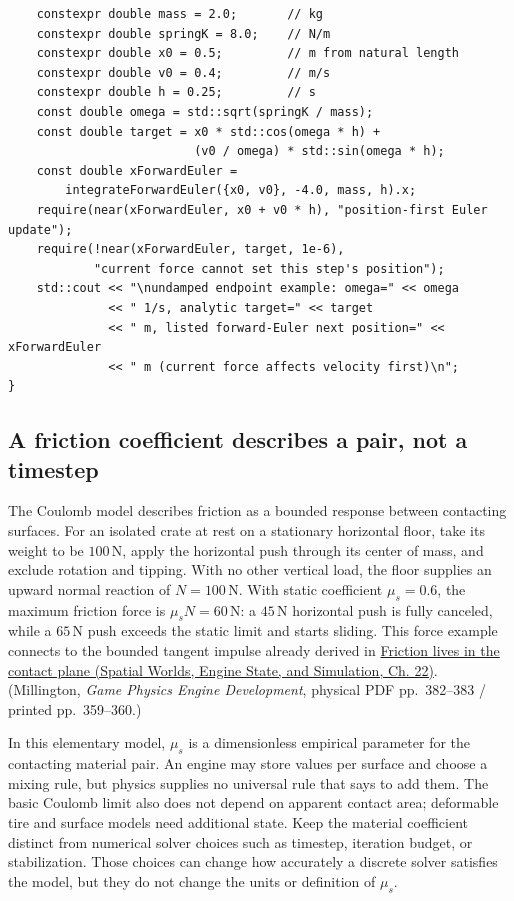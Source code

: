 \begin{verbatim}
    constexpr double mass = 2.0;       // kg
    constexpr double springK = 8.0;    // N/m
    constexpr double x0 = 0.5;         // m from natural length
    constexpr double v0 = 0.4;         // m/s
    constexpr double h = 0.25;         // s
    const double omega = std::sqrt(springK / mass);
    const double target = x0 * std::cos(omega * h) +
                          (v0 / omega) * std::sin(omega * h);
    const double xForwardEuler =
        integrateForwardEuler({x0, v0}, -4.0, mass, h).x;
    require(near(xForwardEuler, x0 + v0 * h), "position-first Euler update");
    require(!near(xForwardEuler, target, 1e-6),
            "current force cannot set this step's position");
    std::cout << "\nundamped endpoint example: omega=" << omega
              << " 1/s, analytic target=" << target
              << " m, listed forward-Euler next position=" << xForwardEuler
              << " m (current force affects velocity first)\n";
}
\end{verbatim}

\subsection{A friction coefficient describes a pair, not a timestep}\label{06-engine-ii-ch047-a-friction-coefficient-describes-a-pair-not-a-timestep}

The Coulomb model describes friction as a bounded response between contacting surfaces. For an isolated crate at rest on a stationary horizontal floor, take its weight to be \(100\,\mathrm N\), apply the horizontal push through its center of mass, and exclude rotation and tipping. With no other vertical load, the floor supplies an upward normal reaction of \(N=100\,\mathrm N\). With static coefficient \(\mu_s=0.6\), the maximum friction force is \(\mu_sN=60\,\mathrm N\): a \(45\,\mathrm N\) horizontal push is fully canceled, while a \(65\,\mathrm N\) push exceeds the static limit and starts sliding. This force example connects to the bounded tangent impulse already derived in \href{../05-Spatial-Worlds-Engine-State-and-Simulation/main.pdf\#nameddest=06-engine-ii-ch033-friction-lives-in-the-contact-plane}{Friction lives in the contact plane (Spatial Worlds, Engine State, and Simulation, Ch. 22)}. (Millington, \emph{Game Physics Engine Development}, physical PDF pp.~382--383 / printed pp.~359--360.)

In this elementary model, \(\mu_s\) is a dimensionless empirical parameter for the contacting material pair. An engine may store values per surface and choose a mixing rule, but physics supplies no universal rule that says to add them. The basic Coulomb limit also does not depend on apparent contact area; deformable tire and surface models need additional state. Keep the material coefficient distinct from numerical solver choices such as timestep, iteration budget, or stabilization. Those choices can change how accurately a discrete solver satisfies the model, but they do not change the units or definition of \(\mu_s\).

